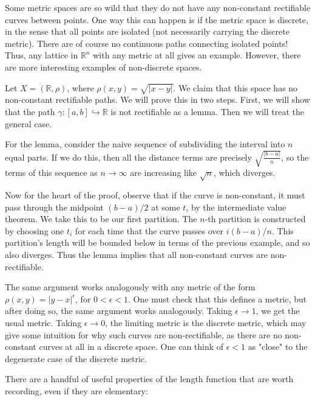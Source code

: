 \documentclass[12pt]{amsart}
\begin{document}
Some metric spaces are so wild that they do not have any non-constant rectifiable curves between points. One way this can happen is if the metric space is discrete, in the sense that all points are isolated (not necessarily carrying the discrete metric). There are of course no continuous paths connecting isolated points! Thus, any lattice in $\mathbb{R}^n$ with any metric at all gives an example. However, there are more interesting examples of non-discrete spaces.

\begin{example}
Let $X = (\mathbb{R}, \rho)$, where $\rho(x,y) = \sqrt{|x-y|}$. We claim that this space has no non-constant rectifiable paths. We will prove this in two steps. First, we will show that the path $\gamma: [a,b] \hookrightarrow \mathbb{R}$ is not rectifiable as a lemma. Then we will treat the general case.

For the lemma, consider the naive sequence of subdividing the interval into $n$ equal parts. If we do this, then all the distance terms are precisely $\sqrt{\frac{|b-a|}{n}}$, so the terms of this sequence as $n \to \infty$ are increasing like $\sqrt{n}$, which diverges.

Now for the heart of the proof, observe that if the curve is non-constant, it must pass through the midpoint $(b-a)/2$ at some $t$, by the intermediate value theorem. We take this to be our first partition. The $n$-th partition is constructed by choosing one $t_i$ for each time that the curve passes over $i(b-a)/n$. This partition's length will be bounded below in terms of the previous example, and so also diverges. Thus the lemma implies that all non-constant curves are non-rectifiable.
\end{example}

\begin{remark}
The same argument works analogously with any metric of the form $\rho(x,y) = |y-x|^\epsilon$, for $0 < \epsilon < 1$. One must check that this defines a metric, but after doing so, the same argument works analogously. Taking $\epsilon \to 1$, we get the usual metric. Taking $\epsilon \to 0$, the limiting metric is the discrete metric, which may give some intuition for why such curves are non-rectifiable, as there are no non-constant curves at all in a discrete space. One can think of $\epsilon < 1$ as "close" to the degenerate case of the discrete metric.
\end{remark}

There are a handful of useful properties of the length function that are worth recording, even if they are elementary:
\end{document}
